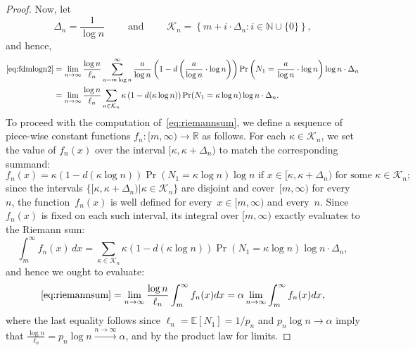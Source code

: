 \documentclass[journal,letterpaper,onecolumn,11pt]{IEEEtran}
\newcommand{\cK}{\mathcal{K}}
\newcommand{\blue}[1]{\textcolor{blue}{#1}}
\begin{document}
\begin{proof}
Now, let 
\[
    \Delta_n=\frac{1}{\log n}
    \qquad\text{ and } \qquad
\mathcal K_n=\left\{m+i\cdot\Delta_n:i\in\mathbb N\cup\{0\}\right\},
\]
and hence,
\begin{align}\label{eq:riemannsum}
    \eqref{eq:fdmlogn2}
    &=
    \lim_{n\to\infty}
    \frac{\log n}{\ell_n}
    \sum_{a= m\log n}^{\infty}
    \frac{a}{\log n}
    \left(1-d\left(\frac{a}{\log n}\cdot\log n\right)\right)
    \Pr\left(N_1=\frac{a}{\log n}\cdot\log n\right)
    \log n\cdot \Delta_n \nonumber\\
    &=\lim_{n\to\infty}
    \frac{\log n}{\ell_n}\sum_{\kappa\in\mathcal K_n}\kappa
    \left(1-d(\kappa\log n)\right)
    \Pr(N_1=\kappa\log n)\log n\cdot
    \Delta_n.
\end{align}
To proceed with the computation of~\eqref{eq:riemannsum}, we define a sequence of piece-wise constant functions $f_n: [m, \infty) \to \mathbb{R}$ as follows.
For each  $\kappa \in \mathcal{K}_n$, we set the value of $f_n(x)$ over the interval $[ \kappa, \kappa + \Delta_n )$ to match the corresponding summand:
$$f_n(x) = \kappa \left(1-d(\kappa\log n)\right) \Pr(N_1=\kappa\log n)\log n \text{ if } x \in [\kappa, \kappa + \Delta_n) \text{ for some }\kappa\in\cK_n;$$
since the intervals $\{[\kappa,\kappa+\Delta_n)\vert \kappa\in\cK_n\}$ are disjoint and cover~$[m,\infty)$ for every~$n$, the function~$f_n(x)$ is well defined for every~$x\in[m,\infty)$ and every~$n$.
Since $f_n(x)$ %
is fixed on each such interval,
its integral over $[m, \infty)$ exactly evaluates to the Riemann  sum:$$\int_m^\infty f_n(x) \, dx = \sum_{\kappa\in\mathcal K_n}\kappa \left(1-d(\kappa\log n)\right) \Pr(N_1=\kappa\log n)\log n \cdot \Delta_n,$$
and hence we ought to evaluate:
\begin{align}\label{equation:getAlphaOut}
\eqref{eq:riemannsum}=\lim_{n\to\infty} \frac{\log n}{\ell_n} \int_m^\infty f_n(x)  dx=\alpha\lim_{n\to\infty} \int_m^\infty f_n(x)  dx,
\end{align}
where the last equality follows since $\ell_n=\mathbb{E}[N_1]=1/p_n$ and $p_n\log n\to\alpha$ imply that $\frac{\log n}{\ell_n}=p_n\log n\xrightarrow{n\to\infty}\alpha$, and by the product law for limits.


\end{proof}
\end{document}
